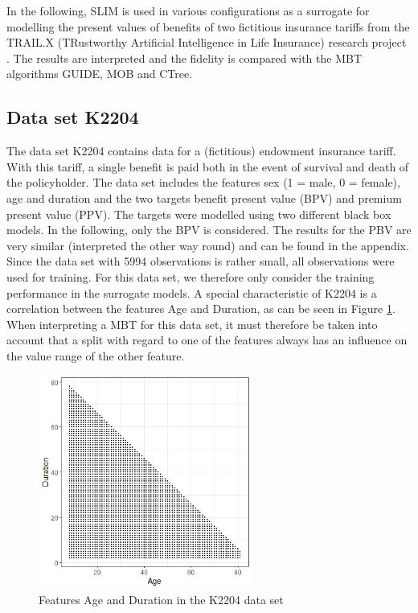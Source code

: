 In the following, SLIM is used in various configurations as a surrogate for modelling the present values of benefits of two fictitious insurance tariffs from the TRAIL.X (TRustworthy Artificial Intelligence in Life Insurance) research project \citep{msginsurit.16.03.2023}. The results are interpreted and the fidelity is compared with the MBT algorithms GUIDE, MOB and CTree.

\subsection{Data set K2204}
The data set K2204 contains data for a (fictitious) endowment insurance tariff. With this tariff, a single benefit is paid both in the event of survival and death of the policyholder. The data set includes the features sex (1 = male, 0 = female), age and duration and the two targets benefit present value (BPV) and premium present value (PPV). The targets were modelled using two different black box models.  
In the following, only the BPV is considered. The results for the PBV are very similar (interpreted the other way round) and can be found in the appendix.
Since the data set with 5994 observations is rather small, all observations were used for training. For this data set, we therefore only consider the training performance in the surrogate models.
A special characteristic of K2204 is a correlation between the features Age and Duration, as can be seen in Figure \ref{fig:ins_corr_age_duration}. When interpreting a MBT for this data set, it must therefore be taken into account that a split with regard to one of the features always has an influence on the value range of the other feature.

\begin{figure}[!htb]
    \centering    
    \includegraphics[width=7cm]{Figures/insurance_use_case/k2204_BPV/corr_age_duration.png}
    \caption{Features Age and Duration in the K2204 data set}
    \label{fig:ins_corr_age_duration}
\end{figure}


